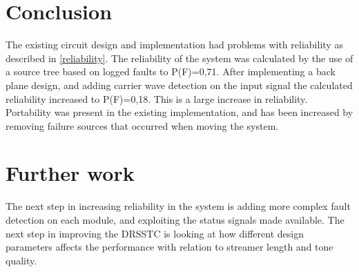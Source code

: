\section{Conclusion}
The existing circuit design and implementation had problems with reliability as described in \cref{reliability}. The reliability of the system was calculated by the use of a source tree based on logged faults to P(F)=0,71. After implementing a back plane design, and adding carrier wave detection on the input signal the calculated reliability increased to P(F)=0,18. This is a large increase in reliability. Portability was present in the existing implementation, and has been increased by removing failure sources that occurred when moving the system.

\section{Further work}
The next step in increasing reliability in the system is adding more complex fault detection on each module, and exploiting the status signals made available. The next step in improving the DRSSTC is looking at how different design parameters affects the performance with relation to streamer length and tone quality.